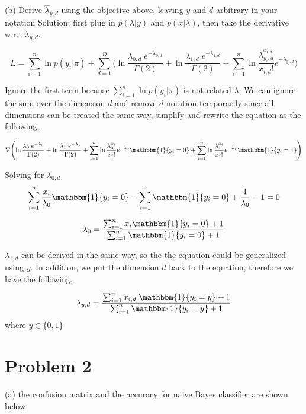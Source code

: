 \documentclass[11pt]{report}
\begin{document}
\pagebreak

\justify (b) Derive $\hat{\lambda}_{y, d}$ using the objective above, leaving $y$ and $d$ arbitrary in your notation
\justify Solution: first plug in $p(\lambda | y)$ and $p(x | \lambda)$, then take the derivative w.r.t $\lambda_{y,d}$. 

\[
L= \sum_{i=1}^{n} \ln {p(y_{i}|\pi)} +  \sum_{d=1}^{D} \Biggl( \ln{ \frac{ \lambda_{0,d} \; e^{-\lambda_{0,d}} } {\Gamma(2)} } + \ln{ \frac{ \lambda_{1,d} \; e^{-\lambda_{1,d}} } {\Gamma(2)} }  + \sum_{i=1}^{n} \ln{\frac{ \lambda_{y_{i}, d}^{x_{i,d}}} {x_{i,d}!}e^ {-\lambda_{y_{i},d}} \Biggr)}
\]

\-
\justify Ignore the first term because $\sum_{i=1}^{n} \ln {p(y_{i}|\pi)}$ is not related $\lambda$. We can ignore the sum over the dimension $d$ and remove $d$ notation temporarily since all dimensions can be treated the same way, simplify and rewrite the equation as the following, 

\begin{small}
\[
\nabla{
\Biggl(
\ln{ \frac{ \lambda_{0} \; e^{-\lambda_{0}} } {\Gamma(2)} } + \ln{ \frac{ \lambda_{1} \; e^{-\lambda_{1}} } {\Gamma(2)} }  
+ \sum_{i=1}^{n} \ln{\frac{ \lambda_{0}^{x_{i}}} {x_{i}!}e^ {-\lambda_{0}}  \mathbbm{1}\{ y_{i} = 0 \} } 
+ \sum_{i=1}^{n} \ln{\frac{ \lambda_{1}^{x_{i}}} {x_{i}!}e^ {-\lambda_{1}}  \mathbbm{1}\{ y_{i} = 1} \}
\Biggr)
}
\]
\end{small}

\-
\justify Solving for $\lambda_{0, d}$
\[
\sum_{i=1}^{n} \frac{ x_{i} } {\lambda_{0}} \mathbbm{1}\{ y_{i} = 0 \}   -  \sum_{i=1}^{n} \mathbbm{1}\{ y_{i} = 0 \}  + \frac {1} {\lambda_{0}} - 1 = 0 
\]

\[
\lambda_{0} = \frac {\sum_{i=1}^{n} x_{i} \mathbbm{1}\{ y_{i} = 0 \} + 1} {\sum_{i=1}^{n} \mathbbm{1}\{ y_{i} = 0 \} + 1} 
\]

\- 
\justify $\lambda_{1,d}$ can be derived in the same way, so the the equation could be generalized using $y$. In addition, we put the dimension $d$ back to the equation, therefore we have the following,

\[
\lambda_{y, d} = \frac {\sum_{i=1}^{n} x_{i, d} \; \mathbbm{1}\{ y_{i} = y \} + 1} {\sum_{i=1}^{n} \mathbbm{1}\{ y_{i} = y \} + 1}  
\]
where $y \in \{0, 1\}$

\pagebreak

\section* {Problem 2}
\justify (a) the confusion matrix and the accuracy for naive Bayes classifier are shown below
\end{document}
